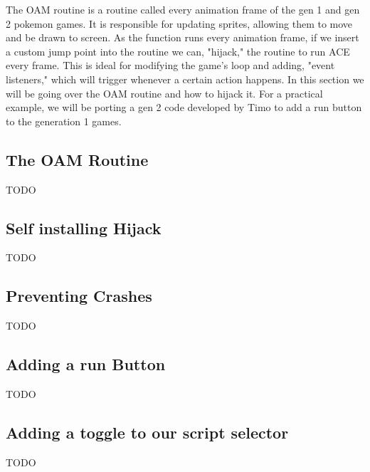 \documentclass[../main.tex]{subfiles}
\begin{document}
    The OAM routine is a routine called every animation frame of the gen 1 and gen 2 pokemon games.  It is responsible for updating sprites, allowing them to move and be drawn to screen.  As the function runs every animation frame, if we insert a custom jump point into the routine we can, "hijack," the routine to run ACE every frame.  This is ideal for modifying the game's loop and adding, "event listeners," which will trigger whenever a certain action happens.  In this section we will be going over the OAM routine and how to hijack it.  For a practical example, we will be porting a gen 2 code developed by Timo to add a run button to the generation 1 games.

    \subsection{The OAM Routine}
    TODO

    \subsection{Self installing Hijack}
    TODO

    \subsection{Preventing Crashes}
    TODO

    \subsection{Adding a run Button}
    TODO

    \subsection{Adding a toggle to our script selector}
    TODO
\end{document}
